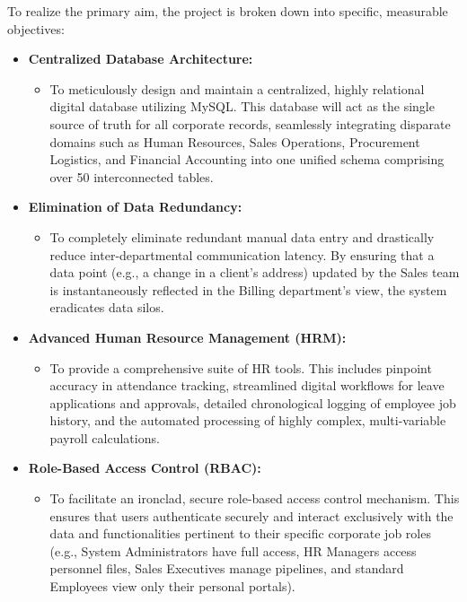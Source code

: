 ﻿\documentclass[12pt,a4paper]{report}
\begin{document}
To realize the primary aim, the project is broken down into specific, measurable objectives:

\begin{itemize}
\item \textbf{Centralized Database Architecture:}
    \begin{itemize}
        \item To meticulously design and maintain a centralized, highly relational digital database utilizing MySQL. This database will act as the single source of truth for all corporate records, seamlessly integrating disparate domains such as Human Resources, Sales Operations, Procurement Logistics, and Financial Accounting into one unified schema comprising over 50 interconnected tables.
    \end{itemize}
\item \textbf{Elimination of Data Redundancy:}
    \begin{itemize}
        \item To completely eliminate redundant manual data entry and drastically reduce inter-departmental communication latency. By ensuring that a data point (e.g., a change in a client's address) updated by the Sales team is instantaneously reflected in the Billing department's view, the system eradicates data silos.
    \end{itemize}
\item \textbf{Advanced Human Resource Management (HRM):}
    \begin{itemize}
        \item To provide a comprehensive suite of HR tools. This includes pinpoint accuracy in attendance tracking, streamlined digital workflows for leave applications and approvals, detailed chronological logging of employee job history, and the automated processing of highly complex, multi-variable payroll calculations.
    \end{itemize}
\item \textbf{Role-Based Access Control (RBAC):}
    \begin{itemize}
        \item To facilitate an ironclad, secure role-based access control mechanism. This ensures that users authenticate securely and interact exclusively with the data and functionalities pertinent to their specific corporate job roles (e.g., System Administrators have full access, HR Managers access personnel files, Sales Executives manage pipelines, and standard Employees view only their personal portals).
    \end{itemize}

\end{itemize}
\end{document}
